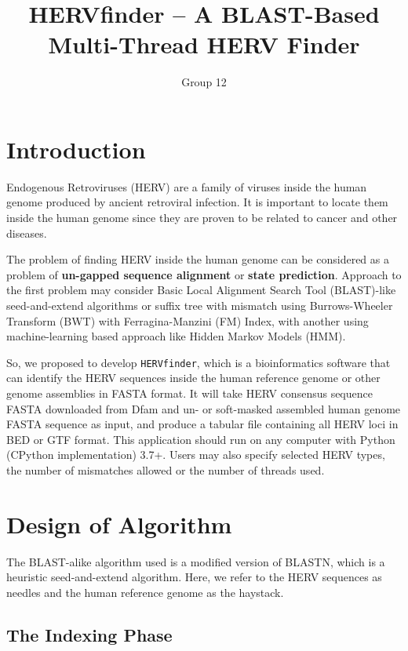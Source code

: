 \documentclass[10pt,final,journal,twocolumn,a4paper]{IEEEtran}
\title{HERVfinder -- A BLAST-Based Multi-Thread HERV Finder}
\author{Group 12}
\begin{document}
\sloppy{}\flushbottom\maketitle\tableofcontents
\section{Introduction}

 Endogenous Retroviruses (HERV) are a family of viruses inside the human genome produced by ancient retroviral infection. It is important to locate them inside the human genome since they are proven to be related to cancer and other diseases.

The problem of finding HERV inside the human genome can be considered as a problem of \textbf{un-gapped sequence alignment} or \textbf{state prediction}. Approach to the first problem may consider Basic Local Alignment Search Tool (BLAST)-like seed-and-extend algorithms or suffix tree with mismatch using Burrows-Wheeler Transform (BWT) with Ferragina-Manzini (FM) Index, with another using machine-learning based approach like Hidden Markov Models (HMM).

So, we proposed to develop \verb|HERVfinder|, which is a bioinformatics software that can identify the HERV sequences inside the human reference genome or other genome assemblies in FASTA format. It will take HERV consensus sequence FASTA downloaded from Dfam and un- or soft-masked assembled human genome FASTA sequence as input, and produce a tabular file containing all HERV loci in BED or GTF format. This application should run on any computer with Python (CPython implementation) 3.7+. Users may also specify selected HERV types, the number of mismatches allowed or the number of threads used.


\section{Design of Algorithm}

The BLAST-alike algorithm used is a modified version of BLASTN, which is a heuristic seed-and-extend algorithm. Here, we refer to the HERV sequences as needles and the human reference genome as the haystack.

\subsection{The \textbf{Indexing} Phase}
\end{document}
